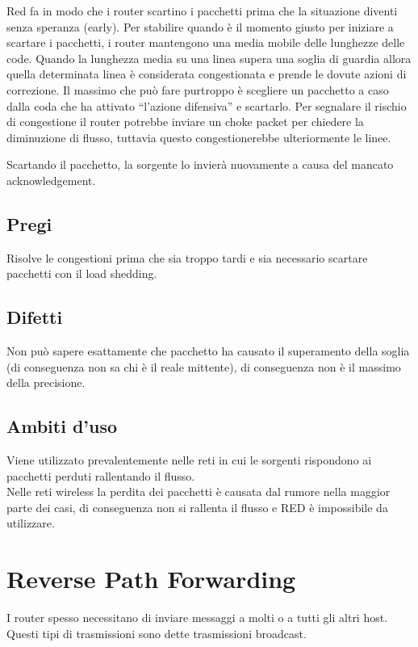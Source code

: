 Red fa in modo che i router scartino i pacchetti prima che la situazione diventi senza speranza (early). Per stabilire quando è il momento giusto per iniziare a scartare i pacchetti, i router mantengono una media mobile delle lunghezze delle code. Quando la lunghezza media su una linea supera una soglia di guardia allora quella determinata linea è considerata congestionata e prende le dovute azioni di correzione. Il massimo che può fare purtroppo è scegliere un pacchetto a caso dalla coda che ha attivato “l'azione difensiva” e scartarlo. Per segnalare il rischio di congestione il router potrebbe inviare un choke packet per chiedere la diminuzione di flusso, tuttavia questo congestionerebbe ulteriormente le linee.

Scartando il pacchetto, la sorgente lo invierà nuovamente a causa del mancato acknowledgement.

\subsection{Pregi}
Risolve le congestioni prima che sia troppo tardi e sia necessario scartare pacchetti con il load shedding.

\subsection{Difetti}
Non può sapere esattamente che pacchetto ha causato il superamento della soglia (di conseguenza non sa chi è il reale mittente), di conseguenza non è il massimo della precisione.

\subsection{Ambiti d'uso}
Viene utilizzato prevalentemente nelle reti in cui le sorgenti rispondono ai pacchetti perduti rallentando il flusso.\\
Nelle reti wireless la perdita dei pacchetti è causata dal rumore nella maggior parte dei casi, di conseguenza non si rallenta il flusso e RED è impossibile da utilizzare.

\section{Reverse Path Forwarding}

I router spesso necessitano di inviare messaggi a molti o a tutti gli altri host. Questi tipi di trasmissioni sono dette trasmissioni broadcast.

